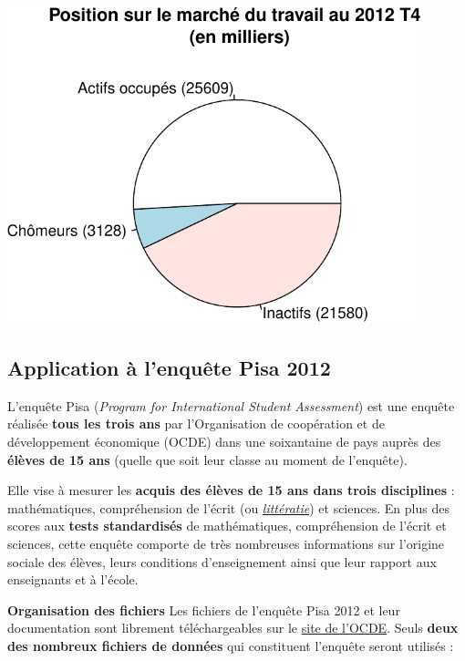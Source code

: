 \documentclass[12pt,twosided, notitlepage]{book}
\begin{document}
\begin{itemize}
  \begin{center}\includegraphics[width=12cm]{livret_files/figure-latex/unnamed-chunk-443-2} \end{center}
\end{itemize}

\subsection{Application à l'enquête Pisa
2012}\label{application-a-lenquete-pisa-2012}

L'enquête Pisa (\textit{Program for International Student Assessment})
est une enquête réalisée \textbf{tous les trois ans} par l'Organisation
de coopération et de développement économique (OCDE) dans une
soixantaine de pays auprès des \textbf{élèves de 15 ans} (quelle que
soit leur classe au moment de l'enquête).

Elle vise à mesurer les \textbf{acquis des élèves de 15 ans dans trois
disciplines} : mathématiques, compréhension de l'écrit (ou
\href{https://fr.wikipedia.org/wiki/Litt\%C3\%A9ratie}{\emph{littératie}})
et sciences. En plus des scores aux \textbf{tests standardisés} de
mathématiques, compréhension de l'écrit et sciences, cette enquête
comporte de très nombreuses informations sur l'origine sociale des
élèves, leurs conditions d'enseignement ainsi que leur rapport aux
enseignants et à l'école.

\textbf{Organisation des fichiers} Les fichiers de l'enquête Pisa 2012
et leur documentation sont librement téléchargeables sur le
\href{http://www.oecd.org/pisa/pisaproducts/pisa2012database-downloadabledata.htm}{site
de l'OCDE}. Seuls \textbf{deux des nombreux fichiers de données} qui
constituent l'enquête seront utilisés :
\end{document}
